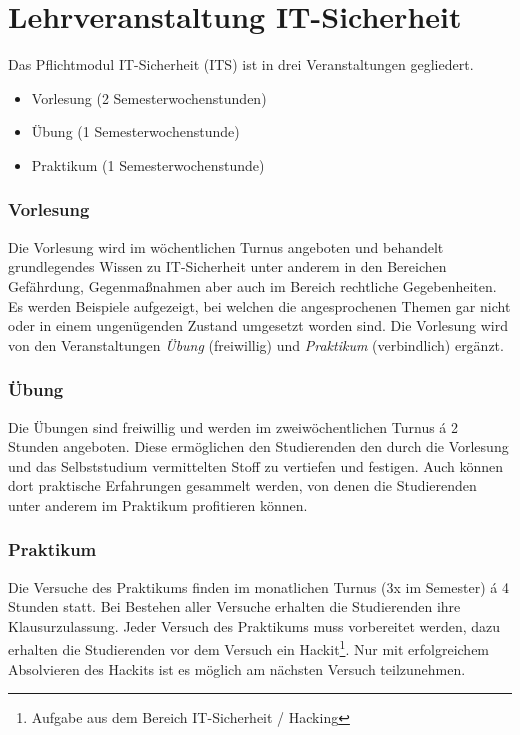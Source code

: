 \section{Lehrveranstaltung IT-Sicherheit} \label{sec:Lehrveranstaltung_IT-Sicherheit}

Das Pflichtmodul IT-Sicherheit (ITS) ist in drei Veranstaltungen gegliedert.\cite[S.30]{hochschuleniederrheinModulhandbuchVollzeitBA2019}
\begin{itemize}
	\item Vorlesung (2 Semesterwochenstunden)
	\item Übung (1 Semesterwochenstunde)
	\item Praktikum (1 Semesterwochenstunde)
\end{itemize}

\subsubsection{Vorlesung}
Die Vorlesung wird im wöchentlichen Turnus angeboten und behandelt grundlegendes Wissen zu IT-Sicherheit unter anderem in den Bereichen Gefährdung, Gegenmaßnahmen aber auch im Bereich rechtliche Gegebenheiten. Es werden Beispiele aufgezeigt, bei welchen die angesprochenen Themen gar nicht oder in einem ungenügenden Zustand umgesetzt worden sind. Die Vorlesung wird von den Veranstaltungen \textit{Übung} (freiwillig) und \textit{Praktikum} (verbindlich) ergänzt.

\subsubsection{Übung}
Die Übungen sind freiwillig und werden im zweiwöchentlichen Turnus á 2 Stunden angeboten. Diese ermöglichen den Studierenden den durch die Vorlesung und das Selbststudium vermittelten Stoff zu vertiefen und festigen. Auch können dort praktische Erfahrungen gesammelt werden, von denen die Studierenden unter anderem im Praktikum profitieren können.

\subsubsection{Praktikum}
Die Versuche des Praktikums finden im monatlichen Turnus (3x im Semester) á 4 Stunden statt. Bei Bestehen aller Versuche erhalten die Studierenden ihre Klausurzulassung. Jeder Versuch des Praktikums muss vorbereitet werden, dazu erhalten die Studierenden vor dem Versuch ein Hackit\footnote{Aufgabe aus dem Bereich IT-Sicherheit / Hacking}. Nur mit erfolgreichem Absolvieren des Hackits ist es möglich am nächsten Versuch teilzunehmen.\cite{quadePraktikumITSecurity2017}